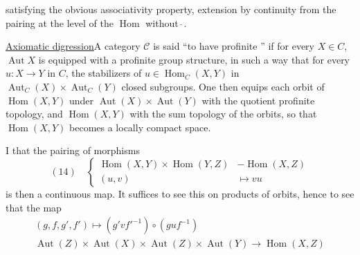 satisfying the obvious associativity property,  extension by continuity from the pairing at the level of the $\operatorname{Hom}$ without $\hat{\ }$. 

\uline{Axiomatic digression}\quad A category $\mathcal{C}$ is said   ``to have profinite  '' if for every $X\in C$, $\operatorname{Aut}X$ is equipped with a profinite group structure, in such a way that for every $u:X\longrightarrow Y$ in $C$, the stabilizers of $u\in\operatorname{Hom}_C(X,Y)$ in $\operatorname{Aut}_C(X)\times\operatorname{Aut}_C(Y)$    closed subgroups.  One then equips each orbit of $\operatorname{Hom}(X,Y)$ under $\operatorname{Aut}(X)\times\operatorname{Aut}(Y)$ with the quotient profinite topology, and $\operatorname{Hom}(X,Y)$ with the  sum topology of the orbits, so that $\operatorname{Hom}(X,Y)$ becomes a locally compact space.

I   that the pairing of morphisms
\[
(14)\quad\left\{
\begin{aligned}
\operatorname{Hom}(X,Y)\times\operatorname{Hom}(Y,Z)&\mathbin{-}\operatorname{Hom}(X,Z)\\
(u,v)&\longmapsto vu
\end{aligned}\right.
\]
is then  a  continuous map. It suffices to see this on products of orbits, hence to see that  the map
\[
\begin{gathered}
(g,f,g',f')\longmapsto(g'vf'^{-1})\circ(guf^{-1})\\
\operatorname{Aut}(Z)\times\operatorname{Aut}(X)\times\operatorname{Aut}(Z)\times\operatorname{Aut}(Y)\longrightarrow\operatorname{Hom}(X,Z)
\end{gathered}
\]
